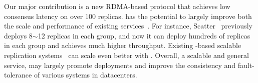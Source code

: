 Our major contribution is a new RDMA-based \paxos protocol that achieves 
low consensus latency on over 100 replicas. \xxx has the potential to largely 
improve both the scale and performance of existing \paxos 
services~\cite{scatter:sosp11,manos:hotdep10,crane:sosp15,rex:eurosys14}. For
instance, Scatter~\cite{scatter:sosp11} previously deploys 8$\sim$12 replicas in
each \paxos group, and now it can deploy hundreds of replicas in each group and 
achieves much higher throughput. Existing \paxos-based scalable replication 
systems~\cite{scatter:sosp11,dssmr,ssmr,mencius:osdi08,spaxos,manos:hotdep10,
scatter:sosp11} can scale even better with \xxx. Overall, a scalable and 
general service, \xxx may largely promote \paxos deployments and improve the 
consistency and fault-tolerance of various systems in datacenters.




